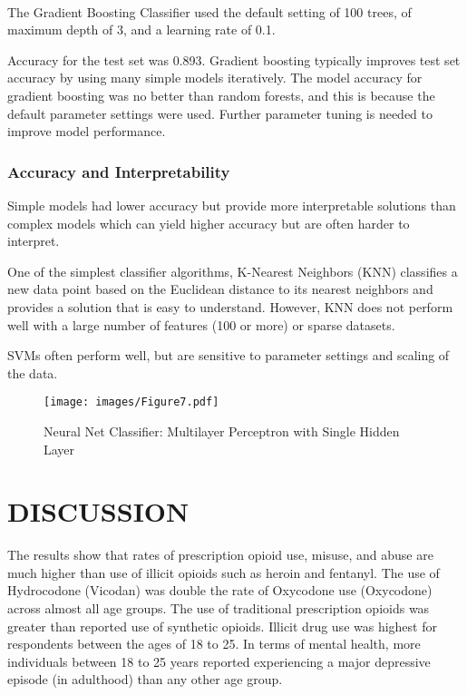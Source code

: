 \\\documentclass[sigconf]{acmart}
\begin{document}
The Gradient Boosting Classifier used the default setting of 100 trees, of 
maximum depth of 3, and a learning rate of 0.1. 

Accuracy for the test set was 0.893. Gradient boosting typically improves test 
set accuracy by using many simple models iteratively. The model accuracy for 
gradient boosting was no better than random forests, and this is because the 
default parameter settings were used. Further parameter tuning is needed 
to improve model performance.


\subsubsection{Accuracy and Interpretability}


Simple models had lower accuracy but provide more interpretable solutions 
than complex models which can yield higher accuracy but are often harder 
to interpret. 

One of the simplest classifier algorithms, K-Nearest Neighbors (KNN)
classifies a new data point based on the Euclidean distance to its 
nearest neighbors and provides a solution that is easy to understand. 
However, KNN does not perform well with a large number of features 
(100 or more) or sparse datasets.

SVMs often perform well, but are sensitive to parameter settings 
and scaling of the data. 

\begin{figure}[!ht]
  \centering\texttt{[image: images/Figure7.pdf]}
  \caption{Neural Net Classifier: Multilayer Perceptron with Single Hidden Layer}
  \label{f:Figur7}
\end{figure}




\section{DISCUSSION}


The results show that rates of prescription opioid use, misuse, and abuse are
much higher than use of illicit opioids such as heroin and fentanyl. The use 
of Hydrocodone (Vicodan) was double the rate of Oxycodone use (Oxycodone) 
across almost all age groups. The use of traditional prescription opioids 
was greater than reported use of synthetic opioids. Illicit drug use was 
highest for respondents between the ages of 18 to 25. In terms of mental 
health, more individuals between 18 to 25 years reported experiencing a major 
depressive episode (in adulthood) than any other age group. 
\end{document}

